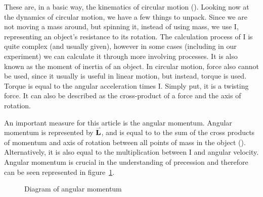 \documentclass{article}
\newcommand{\myvect}[1]{\accentset{\rightharpoonup}{#1}}
\begin{document}
These are, in a basic way, the kinematics of circular motion (\cite{angularvelocity}). Looking now at the dynamics of circular motion, we have a few things to unpack. Since we are not moving a mass around, but spinning it, instead of using mass, we use I, representing an object's resistance to its rotation. The calculation process of I is quite complex (and usually given), however in some cases (including in our experiment) we can calculate it through more involving processes. It is also known as the moment of inertia of an object. In circular motion, force also cannot be used, since it usually is useful in linear motion, but instead, torque is used. Torque is equal to the angular acceleration times I. Simply put, it is a twisting force. It can also be described as the cross-product of a force and the axis of rotation.

An important measure for this article is the angular momentum. Angular momentum is represented by $\myvect{\textbf{L}}$, and is equal to to the sum of the cross products of momentum and axis of rotation between all points of mass in the object (\cite{momentofinertia,listofmomentofinertia}). Alternatively, it is also equal to the multiplication between I and angular velocity. Angular momentum is crucial in the understanding of precession and therefore can be seen represented in figure~\ref{fig:Diagram of angular momentum}.

\begin{figure}[H]
\centering
\caption{Diagram of angular momentum} 
\label{fig:Diagram of angular momentum}
\end{figure}
\end{document}
